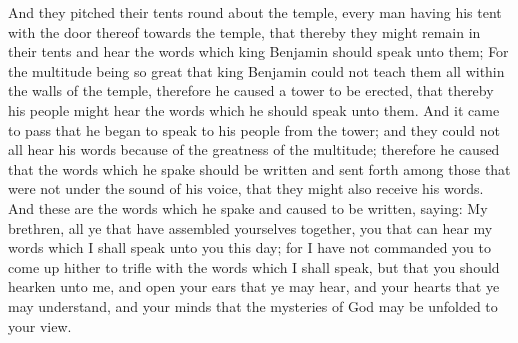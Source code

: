 \bverse \iffalse And they pitched their tents round about the temple, every man having his tent with the door thereof towards the temple, that thereby they might remain in their tents and hear the words which king Benjamin should speak unto them; \fi
And they pitched their tents round about the temple, every man having his tent with the door thereof towards the temple, that thereby they might remain in their tents and hear the words which king Benjamin should speak unto them;
\bverse \iffalse For the multitude being so great that king Benjamin could not teach them all within the walls of the temple, therefore he caused a tower to be erected, that thereby his people might hear the words which he should speak unto them. \fi
For the multitude being so great that king Benjamin could not teach them all within the walls of the temple, therefore he caused a tower to be erected, that thereby his people might hear the words which he should speak unto them.
\bverse \iffalse And it came to pass that he began to speak to his people from the tower; and they could not all hear his words because of the greatness of the multitude; therefore he caused that the words which he spake should be written and sent forth among those that were not under the sound of his voice, that they might also receive his words. \fi
And it came to pass that he began to speak to his people from the tower; and they could not all hear his words because of the greatness of the multitude; therefore he caused that the words which he spake should be written and sent forth among those that were not under the sound of his voice, that they might also receive his words.
\bverse \iffalse And these are the words which he spake and caused to be written, saying: My brethren, all ye that have assembled yourselves together, you that can hear my words which I shall speak unto you this day; for I have not commanded you to come up hither to trifle with the words which I shall speak, but that you should hearken unto me, and open your ears that ye may hear, and your hearts that ye may understand, and your minds that the mysteries of God may be unfolded to your view. \fi
And these are the words which he spake and caused to be written, saying: My brethren, all ye that have assembled yourselves together, you that can hear my words which I shall speak unto you this day; for I have not commanded you to come up hither to trifle with the words which I shall speak, but that you should hearken unto me, and open your ears that ye may hear, and your hearts that ye may understand, and your minds that the mysteries of God may be unfolded to your view.

